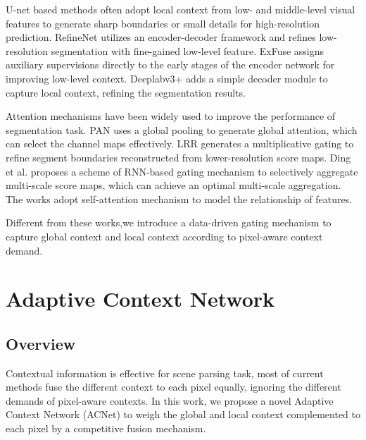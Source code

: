 \documentclass[10pt,twocolumn,letterpaper]{article}
\begin{document}
  U-net based methods often adopt local context from  low- and middle-level visual features to generate sharp boundaries or small details for high-resolution prediction.
RefineNet \cite{refinenet}  utilizes an encoder-decoder framework and refines low-resolution segmentation with fine-gained low-level feature. ExFuse \cite{exfuse}  assigns auxiliary supervisions directly to the early stages of the encoder network for improving low-level context. Deeplabv3+ \cite{chen2018encoder} 
adds a simple  decoder module to capture local context, refining the segmentation results.

 Attention mechanisms have been widely used to  improve the performance of segmentation task. PAN \cite{li2018pyramid} uses a global pooling to generate global attention, which can select the channel maps effectively. LRR \cite{ghiasi2016laplacian}  generates a multiplicative gating to refine segment boundaries reconstructed from lower-resolution score maps.  Ding et al.\cite{ding2018context}  proposes a scheme of RNN-based gating mechanism  to selectively aggregate multi-scale score maps, which can achieve an optimal multi-scale aggregation. The works \cite{fu2018dual,yuan2018ocnet,huang2018ccnet} adopt self-attention mechanism to model the relationship of features.



Different from these works,we introduce a data-driven gating mechanism to capture global context and local context according to pixel-aware context demand.



\section{Adaptive Context Network}


\subsection{Overview}
Contextual information is effective for scene parsing task, most of current methods  fuse the different context  to each pixel equally, ignoring the different demands of  pixel-aware contexts.
In this work, we propose a novel Adaptive Context Network (ACNet) to weigh the global and local context complemented to each pixel by a competitive fusion mechanism.
\end{document}
